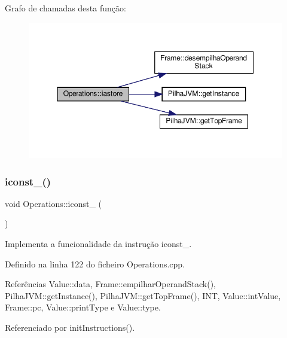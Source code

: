 Grafo de chamadas desta função\+:\nopagebreak
\begin{figure}[H]
\begin{center}
\leavevmode
\includegraphics[width=350pt]{classOperations_aeec162356a6792b1d0ba385f75f443b1_cgraph}
\end{center}
\end{figure}
\mbox{\label{classOperations_a89879486791daebe6659b96688465c9d}} 
\subsubsection{\texorpdfstring{iconst\+\_()}{iconst\_0()}}
{\footnotesize\ttfamily void Operations\+::iconst\+\_ (\begin{DoxyParamCaption}{ }\end{DoxyParamCaption})\hspace{0.3cm}{\ttfamily [private]}}



Implementa a funcionalidade da instrução iconst\+\_. 



Definido na linha 122 do ficheiro Operations.\+cpp.



Referências Value\+::data, Frame\+::empilhar\+Operand\+Stack(), Pilha\+J\+V\+M\+::get\+Instance(), Pilha\+J\+V\+M\+::get\+Top\+Frame(), I\+NT, Value\+::int\+Value, Frame\+::pc, Value\+::print\+Type e Value\+::type.



Referenciado por init\+Instructions().

